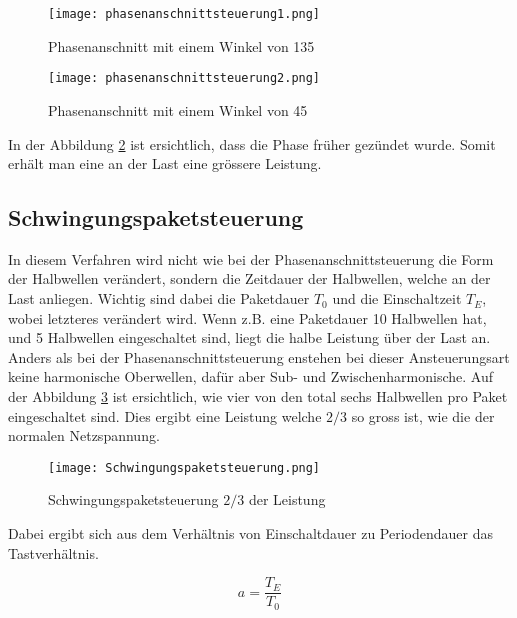 \begin{figure}[ht!]
	\centering
	\texttt{[image: phasenanschnittsteuerung1.png]}	
	\caption{Phasenanschnitt mit einem Winkel von 135\textdegree \cite{Phasenanschnittsteuerung}}\label{fig:Phasenanschnitt1}
\end{figure}
\newpage
\begin{figure}[ht!]
	\centering
	\texttt{[image: phasenanschnittsteuerung2.png]}	
	\caption{Phasenanschnitt mit einem Winkel von 45\textdegree \cite{Phasenanschnittsteuerung}}\label{fig:Phasenanschnitt2}
\end{figure}

In der Abbildung \ref{fig:Phasenanschnitt2} ist ersichtlich, dass die Phase früher gezündet wurde. Somit erhält man eine an der Last eine grössere Leistung.

\subsection{Schwingungspaketsteuerung}
In diesem Verfahren wird nicht wie bei der Phasenanschnittsteuerung die Form der Halbwellen verändert, sondern die Zeitdauer der Halbwellen, welche an der Last anliegen. Wichtig sind dabei die Paketdauer $T_0$ und die Einschaltzeit $T_E$, wobei letzteres verändert wird. Wenn z.B. eine Paketdauer 10 Halbwellen hat, und 5 Halbwellen eingeschaltet sind, liegt die halbe Leistung über der Last an. Anders als bei der Phasenanschnittsteuerung enstehen bei dieser Ansteuerungsart keine harmonische Oberwellen, dafür aber Sub- und Zwischenharmonische. Auf der Abbildung \ref{fig:Schwingungspaketsteuerung} ist ersichtlich, wie vier von den total sechs Halbwellen pro Paket eingeschaltet sind. Dies ergibt eine Leistung welche ${2}/{3}$ so gross ist, wie die der normalen Netzspannung.

\begin{figure}[ht!]
	\centering
	\texttt{[image: Schwingungspaketsteuerung.png]}	
	\caption{Schwingungspaketsteuerung ${2}/{3}$ der Leistung \cite{Schwingungspaketsteuerung}}\label{fig:Schwingungspaketsteuerung}
\end{figure}

Dabei ergibt sich aus dem Verhältnis von Einschaltdauer zu Periodendauer das Tastverhältnis.

\begin{equation}\label{eq:Einschaltverhältnis}
a = \frac{T_E}{T_0}
\end{equation}




